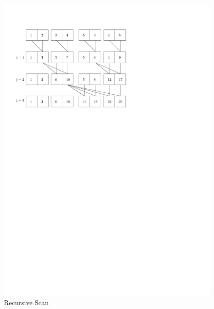 \documentclass[a4paper,twoside,11pt]{article}
\begin{document}
\begin{figure}[hbtp]
\centering
\label{fig:para_algo}
\includegraphics[scale=1]{recur}
\caption{Recursive Scan}
\end{figure}
\end{document}
